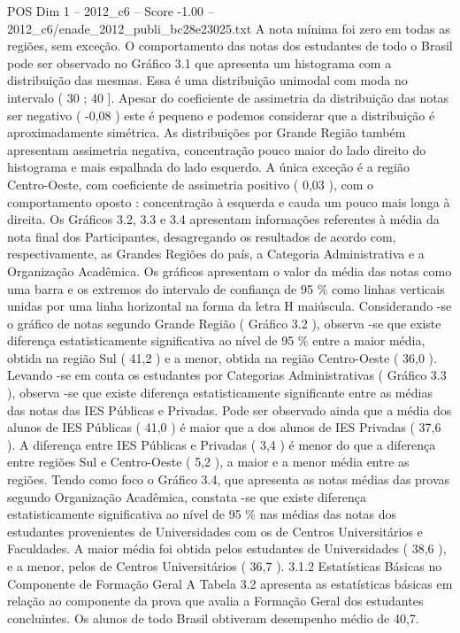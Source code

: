 \begin{textsample}{POS Dim 1 – 2012\_c6 – Score -1.00 – 2012\_c6/enade\_2012\_publi\_bc28e23025.txt}
A nota mínima foi zero em todas as regiões, sem exceção.
O comportamento das notas dos estudantes de todo o Brasil pode ser observado no Gráfico 3.1 que apresenta um histograma com a distribuição das mesmas.
Essa é uma distribuição unimodal com moda no intervalo ( 30 ; 40 ].
Apesar do coeficiente de assimetria da distribuição das notas ser negativo ( -0,08 ) este é pequeno e podemos considerar que a distribuição é aproximadamente simétrica.
As distribuições por Grande Região também apresentam assimetria negativa, concentração pouco maior do lado direito do histograma e mais espalhada do lado esquerdo.
A única exceção é a região Centro-Oeste, com coeficiente de assimetria positivo ( 0,03 ), com o comportamento oposto : concentração à esquerda e cauda um pouco mais longa à direita.
Os Gráficos 3.2, 3.3 e 3.4 apresentam informações referentes à média da nota final dos Participantes, desagregando os resultados de acordo com, respectivamente, as Grandes Regiões do país, a Categoria Administrativa e a Organização Acadêmica.
Os gráficos apresentam o valor da média das notas como uma barra e os extremos do intervalo de confiança de 95 \% como linhas verticais unidas por uma linha horizontal na forma da letra H maiúscula.
Considerando -se o gráfico de notas segundo Grande Região ( Gráfico 3.2 ), observa -se que existe diferença estatisticamente significativa ao nível de 95 \% entre a maior média, obtida na região Sul ( 41,2 ) e a menor, obtida na região Centro-Oeste ( 36,0 ).
Levando -se em conta os estudantes por Categorias Administrativas ( Gráfico 3.3 ), observa -se que existe diferença estatisticamente significante entre as médias das notas das IES Públicas e Privadas.
Pode ser observado ainda que a média dos alunos de IES Públicas ( 41,0 ) é maior que a dos alunos de IES Privadas ( 37,6 ).
A diferença entre IES Públicas e Privadas ( 3,4 ) é menor do que a diferença entre regiões Sul e Centro-Oeste ( 5,2 ), a maior e a menor média entre as regiões.
Tendo como foco o Gráfico 3.4, que apresenta as notas médias das provas segundo Organização Acadêmica, constata -se que existe diferença estatisticamente significativa ao nível de 95 \% nas médias das notas dos estudantes provenientes de Universidades com os de Centros Universitários e Faculdades.
A maior média foi obtida pelos estudantes de Universidades ( 38,6 ), e a menor, pelos de Centros Universitários ( 36,7 ). 3.1.2 Estatísticas Básicas no Componente de Formação Geral A Tabela 3.2 apresenta as estatísticas básicas em relação ao componente da prova que avalia a Formação Geral dos estudantes concluintes.
Os alunos de todo Brasil obtiveram desempenho médio de 40,7.

\end{textsample}
